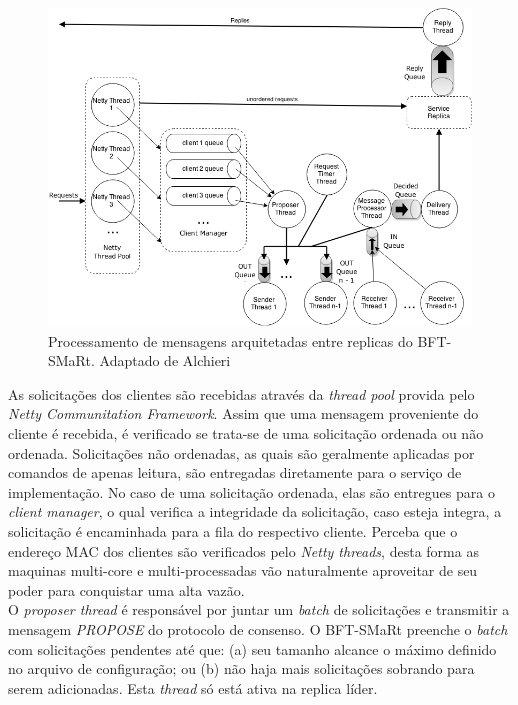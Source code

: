 	\begin{figure}[htb]
		\begin{center}
			
			\includegraphics[clip,width=13.0cm]{images/image5.png}
			\caption{Processamento de mensagens arquitetadas entre replicas do BFT-SMaRt. Adaptado de Alchieri~\cite{bessani3} }
			\label{fig:image5}
		\end{center}
	\end{figure}
	
	As solicitações dos clientes são recebidas através da \textit{thread pool} provida pelo \textit{Netty Communitation Framework}. Assim que uma mensagem proveniente do cliente é recebida, é verificado se trata-se de uma solicitação ordenada ou não ordenada. Solicitações não ordenadas, as quais são geralmente aplicadas por comandos de apenas leitura, são entregadas diretamente para o serviço de implementação. No caso de uma solicitação ordenada, elas são entregues para o \textit{client manager}, o qual verifica a integridade da solicitação, caso esteja integra, a solicitação é encaminhada para a fila do respectivo cliente. Perceba que o endereço MAC dos clientes são verificados pelo \textit{Netty threads}, desta forma as maquinas multi-core e multi-processadas vão naturalmente aproveitar de seu poder para conquistar uma alta vazão. \\ 
	
	O \textit{proposer thread} é responsável por juntar um \textit{batch} de solicitações e transmitir a mensagem \textit{PROPOSE} do protocolo de consenso. O BFT-SMaRt preenche o \textit{batch} com solicitações pendentes até que: (a) seu tamanho alcance o máximo definido no arquivo de configuração; ou (b) não haja mais solicitações sobrando para serem adicionadas. Esta \textit{thread} só está ativa na replica líder. \\
	
